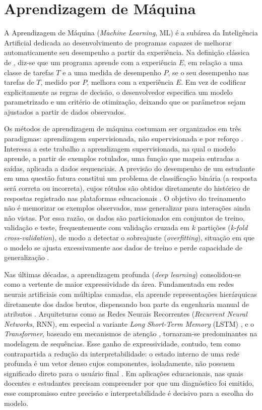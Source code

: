 \section{Aprendizagem de Máquina}
\label{sec:aprendizagem-maquina}

A Aprendizagem de Máquina (\textit{Machine Learning}, ML) é a subárea da Inteligência Artificial dedicada ao desenvolvimento de programas capazes de melhorar automaticamente seu desempenho a partir da experiência. Na definição clássica de , diz-se que um programa aprende com a experiência $E$, em relação a uma classe de tarefas $T$ e a uma medida de desempenho $P$, se o seu desempenho nas tarefas de $T$, medido por $P$, melhora com a experiência $E$. Em vez de codificar explicitamente as regras de decisão, o desenvolvedor especifica um modelo parametrizado e um critério de otimização, deixando que os parâmetros sejam ajustados a partir de dados observados.

Os métodos de aprendizagem de máquina costumam ser organizados em três paradigmas: aprendizagem supervisionada, não supervisionada e por reforço \cite{mitchell_machine_1997}. Interessa a este trabalho a aprendizagem supervisionada, na qual o modelo aprende, a partir de exemplos rotulados, uma função que mapeia entradas a saídas, aplicada a dados sequenciais. A previsão do desempenho de um estudante em uma questão futura constitui um problema de classificação binária (a resposta será correta ou incorreta), cujos rótulos são obtidos diretamente do histórico de respostas registrado nas plataformas educacionais \cite{cui_rebalancing_2025}. O objetivo do treinamento não é memorizar os exemplos observados, mas generalizar para interações ainda não vistas. Por essa razão, os dados são particionados em conjuntos de treino, validação e teste, frequentemente com validação cruzada em $k$ partições (\textit{k-fold cross-validation}), de modo a detectar o sobreajuste (\textit{overfitting}), situação em que o modelo se ajusta excessivamente aos dados de treino e perde capacidade de generalização \cite{shen_assessing_2022, nagatani_augmenting_2019}.

Nas últimas décadas, a aprendizagem profunda (\textit{deep learning}) consolidou-se como a vertente de maior expressividade da área. Fundamentada em redes neurais artificiais com múltiplas camadas, ela aprende representações hierárquicas diretamente dos dados brutos, dispensando boa parte da engenharia manual de atributos \cite{lecun_deep_2015}. Arquiteturas como as Redes Neurais Recorrentes (\textit{Recurrent Neural Networks}, RNN), em especial a variante \textit{Long Short-Term Memory} (LSTM) \cite{hochreiter_long_1997}, e o \textit{Transformer}, baseado em mecanismos de atenção \cite{vaswani_attention_2017}, tornaram-se predominantes na modelagem de sequências. Esse ganho de expressividade, contudo, tem como contrapartida a redução da interpretabilidade: o estado interno de uma rede profunda é um vetor denso cujos componentes, isoladamente, não possuem significado direto para o usuário final \cite{cao_multi-granularity_2025}. Em aplicações educacionais, nas quais docentes e estudantes precisam compreender por que um diagnóstico foi emitido, esse compromisso entre precisão e interpretabilidade é decisivo para a escolha do modelo.

